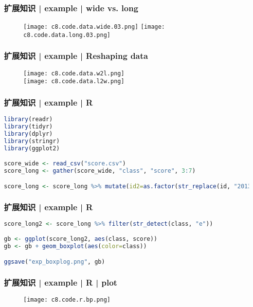 \begin{frame}
  \frametitle{扩展知识 | example | wide vs. long}
  \begin{figure}
    \centering
    \texttt{[image: c8.code.data.wide.03.png]}\qquad
    \texttt{[image: c8.code.data.long.03.png]}
  \end{figure}
\end{frame}

\begin{frame}
  \frametitle{扩展知识 | example | Reshaping data}
  \begin{figure}
    \centering
    \texttt{[image: c8.code.data.w2l.png]}\\
    \vspace{0.5em}
    \texttt{[image: c8.code.data.l2w.png]}
  \end{figure}
\end{frame}

\begin{frame}[fragile]
  \frametitle{扩展知识 | example | R}
\begin{lstlisting}[language=r]
library(readr)
library(tidyr)
library(dplyr)
library(stringr)
library(ggplot2)

score_wide <- read_csv("score.csv")
score_long <- gather(score_wide, "class", "score", 3:7)

score_long <- score_long %>% mutate(id2=as.factor(str_replace(id, "20130521", "")))
\end{lstlisting}
\end{frame}

\begin{frame}[fragile]
  \frametitle{扩展知识 | example | R}
\begin{lstlisting}[language=r]
score_long2 <- score_long %>% filter(str_detect(class, "e"))

gb <- ggplot(score_long2, aes(class, score))
gb <- gb + geom_boxplot(aes(color=class))

ggsave("exp_boxplog.png", gb)
\end{lstlisting}
\end{frame}

\begin{frame}
  \frametitle{扩展知识 | example | R | plot}
  \begin{figure}
    \centering
    \texttt{[image: c8.code.r.bp.png]}
  \end{figure}
\end{frame}

